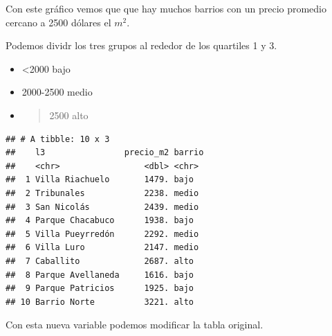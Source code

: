 \documentclass[]{book}
\newenvironment{Shaded}{\begin{snugshade}}{\end{snugshade}}
\newcommand{\DataTypeTok}[1]{\textcolor[rgb]{0.13,0.29,0.53}{#1}}
\newcommand{\DecValTok}[1]{\textcolor[rgb]{0.00,0.00,0.81}{#1}}
\newcommand{\KeywordTok}[1]{\textcolor[rgb]{0.13,0.29,0.53}{\textbf{#1}}}
\newcommand{\NormalTok}[1]{#1}
\newcommand{\OperatorTok}[1]{\textcolor[rgb]{0.81,0.36,0.00}{\textbf{#1}}}
\newcommand{\StringTok}[1]{\textcolor[rgb]{0.31,0.60,0.02}{#1}}
\begin{document}
Con este gráfico vemos que que hay muchos barrios con un precio promedio cercano a 2500 dólares el \(m^2\).

Podemos dividr los tres grupos al rededor de los quartiles 1 y 3.

\begin{itemize}
\item
  \textless{}2000 bajo
\item
  2000-2500 medio
\item
  \begin{quote}
  2500 alto
  \end{quote}
\end{itemize}

\begin{Shaded}
\end{Shaded}

\begin{verbatim}
## # A tibble: 10 x 3
##    l3                precio_m2 barrio
##    <chr>                 <dbl> <chr> 
##  1 Villa Riachuelo       1479. bajo  
##  2 Tribunales            2238. medio 
##  3 San Nicolás           2439. medio 
##  4 Parque Chacabuco      1938. bajo  
##  5 Villa Pueyrredón      2292. medio 
##  6 Villa Luro            2147. medio 
##  7 Caballito             2687. alto  
##  8 Parque Avellaneda     1616. bajo  
##  9 Parque Patricios      1925. bajo  
## 10 Barrio Norte          3221. alto
\end{verbatim}

Con esta nueva variable podemos modificar la tabla original.

\begin{Shaded}
\end{Shaded}
\end{document}

